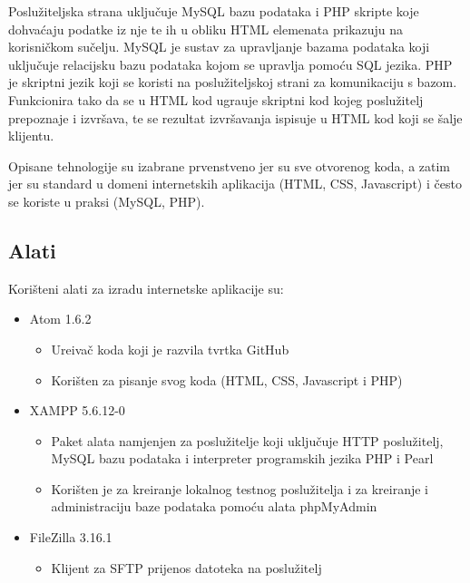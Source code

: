 Poslu\v{z}iteljska strana uklju\v{c}uje MySQL \cite{mysql} bazu podataka i PHP \cite{php} skripte koje dohva\'{c}aju podatke iz nje te ih u obliku HTML elemenata prikazuju na korisni\v{c}kom su\v{c}elju. MySQL je sustav za upravljanje bazama podataka koji uklju\v{c}uje relacijsku bazu podataka kojom se upravlja pomo\'{c}u SQL jezika. PHP je skriptni jezik koji se koristi na poslu\v{z}iteljskoj strani za komunikaciju s bazom. Funkcionira tako da se u HTML kod ugra\dj uje skriptni kod kojeg poslu\v{z}itelj prepoznaje i izvr\v{s}ava, te se rezultat izvr\v{s}avanja ispisuje u HTML kod koji se \v{s}alje klijentu.

Opisane tehnologije su izabrane prvenstveno jer su sve otvorenog koda, a zatim jer su standard u domeni internetskih aplikacija (HTML, CSS, Javascript) i \v{c}esto se koriste u praksi (MySQL, PHP).

\subsection{Alati}
Kori\v{s}teni alati za izradu internetske aplikacije su:
\begin{itemize}
	\item Atom 1.6.2 \cite{atom}
	\begin{itemize}
		\item Ure\dj iva\v{c} koda koji je razvila tvrtka GitHub
		\item Kori\v{s}ten za pisanje svog koda (HTML, CSS, Javascript i PHP)
	\end{itemize}
	
	\item XAMPP 5.6.12-0 \cite{xampp}
	\begin{itemize}
		\item Paket alata namjenjen za poslu\v{z}itelje koji uklju\v{c}uje HTTP poslu\v{z}itelj, MySQL bazu podataka i interpreter programskih jezika PHP i Pearl
		\item Kori\v{s}ten je za kreiranje lokalnog testnog poslu\v{z}itelja i za kreiranje i administraciju baze podataka pomo\'{c}u alata phpMyAdmin
	\end{itemize}
	
	\item FileZilla 3.16.1 \cite{filezilla}
	\begin{itemize}
		\item Klijent za SFTP prijenos datoteka na poslu\v{z}itelj
	\end{itemize}
\end{itemize}